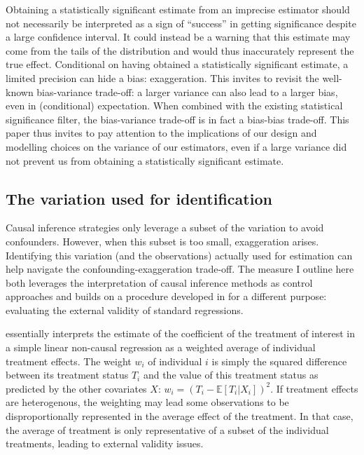 \documentclass[usletter, 12pt]{article}
\begin{document}
				 Obtaining a statistically significant estimate from an imprecise estimator should not necessarily be interpreted as a sign of ``success'' in getting significance despite a large confidence interval. It could instead be a warning that this estimate may come from the tails of the distribution and would thus inaccurately represent the true effect. Conditional on having obtained a statistically significant estimate, a limited precision can hide a bias: exaggeration. This invites to revisit the well-known bias-variance trade-off: a larger variance can also lead to a larger bias, even in (conditional)  expectation. When combined with the existing statistical significance filter, the bias-variance trade-off is in fact a bias-bias trade-off. This paper thus invites to pay attention to the implications of our design and modelling choices on the variance of our estimators, even if a large variance did not prevent us from obtaining a statistically significant estimate.
			
		\subsection{The variation used for identification}
		
				Causal inference strategies only leverage a subset of the variation to avoid confounders. However, when this subset is too small, exaggeration arises. Identifying this variation (and the observations) actually used for estimation can help navigate the confounding-exaggeration trade-off. The measure I outline here both leverages the interpretation of causal inference methods as control approaches and builds on a procedure developed in \cite{aronow_does_2016} for a different purpose: evaluating the external validity of standard regressions.
				
				\cite{aronow_does_2016} essentially interprets the estimate of the coefficient of the treatment of interest in a simple linear non-causal regression as a weighted average of individual treatment effects. The weight $w_{i}$ of individual $i$ is simply the squared difference between its treatment status $T_{i}$ and the value of this treatment status as predicted by the other covariates $X$: $w_{i} = (T_{i} - \mathbb{E}[T_{i} | X_{i}])^{2}$. If treatment effects are heterogenous, the weighting may lead some observations to be disproportionally represented in the average effect of the treatment. %
				In that case, the average of treatment is only representative of a subset of the individual treatments, leading to external validity issues. 
				
\end{document}

